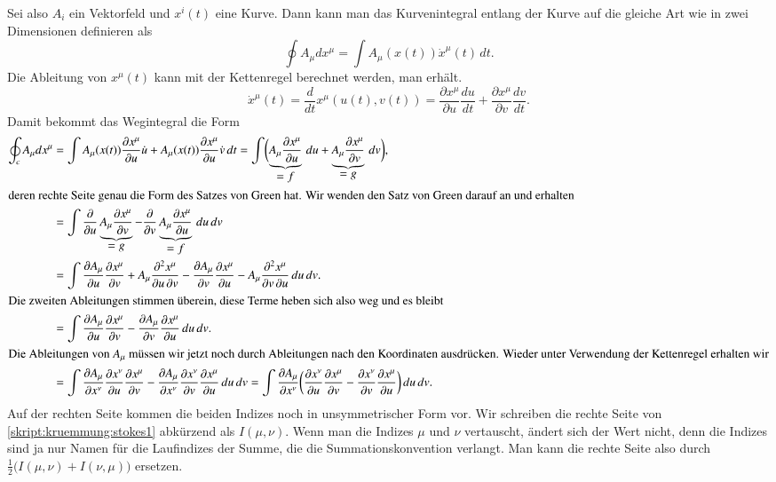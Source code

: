 Sei also $A_i$ ein Vektorfeld und $x^i(t)$ eine Kurve.
Dann kann man das Kurvenintegral entlang der Kurve auf die gleiche Art
wie in zwei Dimensionen definieren als
\[
\oint A_\mu dx^\mu = \int A_\mu(x(t)) \dot x^\mu(t)\,dt.
\]
Die Ableitung von $x^\mu(t)$ kann mit der Kettenregel berechnet
werden, man erhält.
\[
\dot x^\mu(t)
=
\frac{d}{dt} x^\mu(u(t), v(t))
=
\frac{\partial x^\mu}{\partial u} \frac{du}{dt}
+
\frac{\partial x^\mu}{\partial v} \frac{dv}{dt}.
\]
Damit bekommt das Wegintegral die Form
\begin{align}
\oint_c A_\mu dx^\mu
&=
\int
A_\mu(x(t))
\frac{\partial x^\mu}{\partial u}\dot u
+
A_\mu(x(t))
\frac{\partial x^\mu}{\partial u}\dot v
\,dt
=
\int
\biggl(
\underbrace{A_\mu \frac{\partial x^\mu}{\partial u}}_{\displaystyle=f}\,du
+
\underbrace{A_\mu \frac{\partial x^\mu}{\partial v}}_{\displaystyle=g}\,dv
\biggr),
\notag
\\
\intertext{%
deren rechte Seite genau die Form des Satzes von Green hat.
Wir wenden den Satz von Green darauf an und erhalten}
&=
\int
\frac{\partial}{\partial u}
\underbrace{A_\mu\frac{\partial x^\mu}{\partial v}}_{\displaystyle=g}
-
\frac{\partial}{\partial v}
\underbrace{A_\mu\frac{\partial x^\mu}{\partial u}}_{\displaystyle=f}
\,du\,dv
\notag
\\
&=
\int
\frac{\partial A_\mu}{\partial u}\frac{\partial x^\mu}{\partial v}
+A_\mu\frac{\partial^2 x^\mu}{\partial u\,\partial v}
-
\frac{\partial A_\mu}{\partial v}\frac{\partial x^\mu}{\partial u}
-A_\mu\frac{\partial^2 x^\mu}{\partial v\,\partial u}
\,du\,dv.
\notag
\\
\intertext{Die zweiten Ableitungen stimmen überein, diese Terme heben
sich also weg und es bleibt}
&=
\int
\frac{\partial A_\mu}{\partial u}\frac{\partial x^\mu}{\partial v}
-
\frac{\partial A_\mu}{\partial v}\frac{\partial x^\mu}{\partial u}
\,du\,dv.
\notag
\\
\intertext{Die Ableitungen von $A_\mu$ müssen wir jetzt noch durch
Ableitungen nach den Koordinaten ausdrücken.
Wieder unter Verwendung der Kettenregel erhalten wir}
&=
\int
\frac{\partial A_\mu}{\partial x^\nu}\frac{\partial x^\nu}{\partial u}\frac{\partial x^\mu}{\partial v}
-
\frac{\partial A_\mu}{\partial x^\nu}\frac{\partial x^\nu}{\partial v}\frac{\partial x^\mu}{\partial u}
\,du\,dv
=
\int
\frac{\partial A_\mu}{\partial x^\nu}
\biggl(\frac{\partial x^\nu}{\partial u}\frac{\partial x^\mu}{\partial v}
-
\frac{\partial x^\nu}{\partial v}\frac{\partial x^\mu}{\partial u}
\biggr)
\,du\,dv.
\label{skript:kruemmung:stokes1}
\end{align}
Auf der rechten Seite kommen die beiden Indizes noch in unsymmetrischer
Form vor.
Wir schreiben die rechte Seite von \eqref{skript:kruemmung:stokes1}
abkürzend als $I(\mu,\nu)$.
Wenn man die Indizes $\mu$ und $\nu$ vertauscht, ändert sich der Wert nicht,
denn die Indizes sind ja nur Namen für die Laufindizes der Summe, die
die Summationskonvention verlangt.
Man kann die rechte Seite also durch
$\frac12\bigl(I(\mu,\nu)+I(\nu,\mu)\bigr)$
ersetzen.

